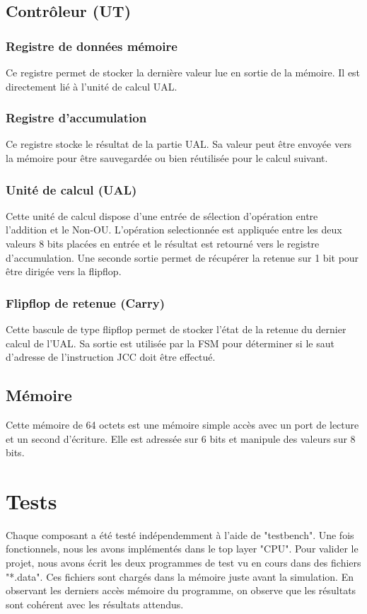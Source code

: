 \documentclass{article}
\begin{document}
    \subsection{Contrôleur (UT)}
    \subsubsection{Registre de données mémoire}
    \par Ce registre permet de stocker la dernière valeur lue en sortie de la mémoire. Il est directement lié à l'unité de calcul UAL.
    \subsubsection{Registre d'accumulation}
    \par Ce registre stocke le résultat de la partie UAL. Sa valeur peut être envoyée vers la mémoire pour être sauvegardée ou bien réutilisée pour le calcul suivant.
    \subsubsection{Unité de calcul (UAL)}
    \par Cette unité de calcul dispose d'une entrée de sélection d'opération entre l'addition et le Non-OU. L'opération selectionnée est appliquée entre les deux valeurs 8 bits placées en entrée et le résultat est retourné vers le registre d'accumulation. Une seconde sortie permet de récupérer la retenue sur 1 bit pour être dirigée vers la flipflop.
    \subsubsection{Flipflop de retenue (Carry)}
    \par Cette bascule de type flipflop permet de stocker l'état de la retenue du dernier calcul de l'UAL. Sa sortie est utilisée par la FSM pour déterminer si le saut d'adresse de l'instruction JCC doit être effectué.
    \subsection{Mémoire}
	\par Cette mémoire de 64 octets est une mémoire simple accès avec un port de lecture et un second d'écriture. Elle est adressée sur 6 bits et manipule des valeurs sur 8 bits.
	
	\section{Tests}
    \par Chaque composant a été testé indépendemment à l'aide de "testbench". Une fois fonctionnels, nous les avons implémentés dans le top layer "CPU". Pour valider le projet, nous avons écrit les deux programmes de test vu en cours dans des fichiers "*.data". Ces fichiers sont chargés dans la mémoire juste avant la simulation. En observant les derniers accès mémoire du programme, on observe que les résultats sont cohérent avec les résultats attendus.
\end{document}
